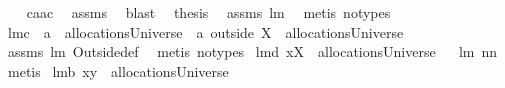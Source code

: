 \begin{isabellebody}
%
\isatagproof
{}\isamarkupfalse%
\ {\isacharminus}\ \isamarkupfalse%
\ {\isachardoublequoteopen}c{\isacharequal}a{\isacharminus}{\isacharparenleft}a{\isacharminus}c{\isacharparenright}{\isachardoublequoteclose}\ \isamarkupfalse%
\ assms{\isacharparenleft}{}{\isacharparenright}\ \isamarkupfalse%
\ blast\ \isamarkupfalse%
\ {\isacharquery}thesis\ \isamarkupfalse%
\ assms{\isacharparenleft}{}{\isacharparenright}\ lm{}{}\ \isamarkupfalse%
\ {\isacharparenleft}metis\ {\isacharparenleft}no{\isacharunderscore}types{\isacharparenright}{\isacharparenright}\ \isamarkupfalse%
%
\endisatagproof
{\isafoldproof}%
%
\isadelimproof
\isanewline
%
\endisadelimproof
{}\isamarkupfalse%
\ lm{}{}c{\isacharcolon}\ \ {\isachardoublequoteopen}a\ {\isasymin}\ allocationsUniverse{\isachardoublequoteclose}\ \ {\isachardoublequoteopen}a\ outside\ X\ {\isasymin}\ allocationsUniverse{\isachardoublequoteclose}\isanewline
%
\isadelimproof
%
\endisadelimproof
%
\isatagproof
{}\isamarkupfalse%
\ assms\ lm{}{}\ Outside{\isacharunderscore}def\ \isamarkupfalse%
\ {\isacharparenleft}metis\ {\isacharparenleft}no{\isacharunderscore}types{\isacharparenright}{\isacharparenright}%
\endisatagproof
{\isafoldproof}%
%
\isadelimproof
\isanewline
%
\endisadelimproof
\isanewline
{}\isamarkupfalse%
\ lm{}{}d{\isacharcolon}\ {\isachardoublequoteopen}{\isacharbraceleft}x{\isacharbraceright}{\isasymtimes}{\isacharparenleft}{\isacharbraceleft}X{\isacharbraceright}{\isacharminus}{\isacharbraceleft}{\isacharbraceleft}{\isacharbraceright}{\isacharbraceright}{\isacharparenright}\ {\isasymin}\ allocationsUniverse{\isachardoublequoteclose}%
\isadelimproof
\ %
\endisadelimproof
%
\isatagproof
{}\isamarkupfalse%
\ lm{}{}\ nn{}{}\ \isamarkupfalse%
\ metis%
\endisatagproof
{\isafoldproof}%
%
\isadelimproof
%
\endisadelimproof
\isanewline
{}\isamarkupfalse%
\ lm{}{}b{\isacharcolon}\ {\isachardoublequoteopen}{\isacharbraceleft}{\isacharparenleft}x{\isacharcomma}{\isacharbraceleft}y{\isacharbraceright}{\isacharparenright}{\isacharbraceright}\ {\isasymin}\ allocationsUniverse{\isachardoublequoteclose}%
\isadelimproof
\ %
\endisadelimproof
%
\isatagproof

\end{isabellebody}
